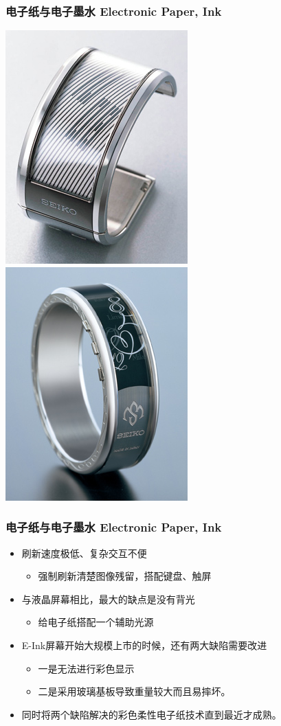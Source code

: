 \documentclass{beamer}
\begin{document}
\begin{frame}
	\frametitle{电子纸与电子墨水 Electronic Paper, Ink}
	\transwipe
	\begin{center}
	\includegraphics[height=.8\textheight, width=.4\textwidth]{images/e-ink-watch1.jpg}
	\includegraphics[height=.8\textheight, width=.4\textwidth]{images/e-ink-watch2.jpg}
	\end{center}
\end{frame}

\begin{frame}
	\frametitle{电子纸与电子墨水 Electronic Paper, Ink}
	\beamertemplatetransparentcovereddynamicmedium
	\begin{itemize}
		\item 刷新速度极低、复杂交互不便\pause
		\begin{itemize}
			\item 强制刷新清楚图像残留，搭配键盘、触屏
		\end{itemize}\pause
		\item 与液晶屏幕相比，最大的缺点是没有背光\pause
		\begin{itemize}
			\item 给电子纸搭配一个辅助光源
		\end{itemize}\pause
		\item E-Ink屏幕开始大规模上市的时候，还有两大缺陷需要改进\pause
		\begin{itemize}
			\item 一是无法进行彩色显示
			\item 二是采用玻璃基板导致重量较大而且易摔坏。
		\end{itemize}
		\item 同时将两个缺陷解决的彩色柔性电子纸技术直到最近才成熟。
	\end{itemize}
\end{frame}
\end{document}
